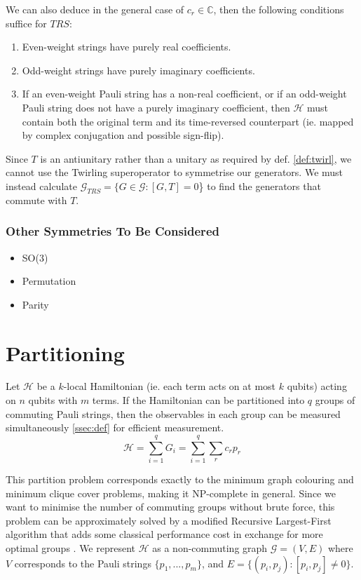 \documentclass{article}
\newcommand{\ham}{\mathcal{H}}
\newcommand{\genset}{\mathcal{G}}
\begin{document}
We can also deduce in the general case of $c_r \in \mathbb{C}$, then the following conditions suffice for $TRS$:
\begin{enumerate}[(1)]
    \item Even-weight strings have purely real coefficients.
    \item Odd-weight strings have purely imaginary coefficients.
    \item If an even-weight Pauli string has a non-real coefficient, or if an odd-weight Pauli string does not have a purely imaginary coefficient, then $\ham$ must contain both the original term and its time-reversed counterpart (ie. mapped by complex conjugation and possible sign-flip).
\end{enumerate}

Since $T$ is an antiunitary rather than a unitary as required by def. \ref{def:twirl}, we cannot use the Twirling superoperator to symmetrise our generators. We must instead calculate $\genset_{TRS}=\{G \in \genset :  [G, T] = 0$\} to find the generators that commute with $T$.

\subsubsection{Other Symmetries To Be Considered}
\begin{itemize}
    \item SO(3)
    \item Permutation
    \item Parity
\end{itemize}
	
\section{Partitioning}

Let $\ham$ be a $k$-local Hamiltonian (ie. each term acts on at most $k$ qubits) acting on $n$ qubits with $m$ terms. If the Hamiltonian can be partitioned into $q$ groups of commuting Pauli strings, then the observables in each group can be measured simultaneously \ref{ssec:def} for efficient measurement.\begin{equation}
    \ham = \sum_{i=1}^q G_i = \sum_{i=1}^q\sum_r c_rp_r
\end{equation}

This partition problem corresponds exactly to the minimum graph colouring and minimum clique cover problems, making it NP-complete in general. Since we want to minimise the number of commuting groups without brute force, this problem can be approximately solved by a modified Recursive Largest-First algorithm that adds some classical performance cost in exchange for more optimal groups \cite{adegbindin2016}. We represent $\ham$ as a non-commuting graph $\genset = (V,E)$ where $V$ corresponds to the Pauli strings $\{p_1, ..., p_m\}$, and $E = \{(p_i, p_j) : [p_i, p_j] \neq 0\}$.
\end{document}
